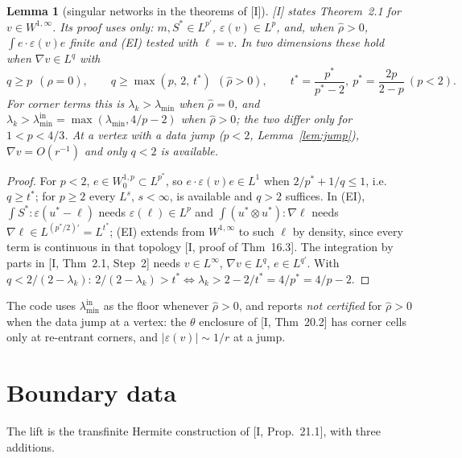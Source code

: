 \documentclass[11pt]{article}
\newtheorem{lemma}[theorem]{Lemma}
\theoremstyle{definition}
\newcommand{\eps}{\varepsilon}
\begin{document}
\begin{lemma}[singular networks in the theorems of {[I]}]\label{lem:sing}
[I] states Theorem~2.1 for $v\in W^{1,\infty}$. Its proof uses only: $m,S^*\in L^{p'}$, $\eps(v)\in L^p$, and, when
$\hat\rho>0$, $\int e\cdot\eps(v)e$ finite and (EI) tested with $\ell=v$. In two dimensions these hold when
$\nabla v\in L^q$ with
\[
q\ge p\ \ (\hat\rho=0),\qquad q\ge\max(p,\,2,\,t^*)\ \ (\hat\rho>0),\qquad t^*=\frac{p^*}{p^*-2},\ p^*=\frac{2p}{2-p}\ (p<2).
\]
For corner terms this is $\lambda_k>\lambda_{\min}$ when $\hat\rho=0$, and $\lambda_k>\lambda_{\min}^{\mathrm{in}}=\max(\lambda_{\min},4/p-2)$
when $\hat\rho>0$; the two differ only for $1<p<4/3$. At a vertex with a data jump ($p<2$, Lemma~\ref{lem:jump}),
$\nabla v=O(r^{-1})$ and only $q<2$ is available.
\end{lemma}
\begin{proof}
For $p<2$, $e\in W^{1,p}_0\subset L^{p^*}$, so $e\cdot\eps(v)e\in L^1$ when $2/p^*+1/q\le1$, i.e.\ $q\ge t^*$; for $p\ge2$
every $L^s$, $s<\infty$, is available and $q>2$ suffices. In (EI), $\int S^*:\eps(u^*-\ell)$ needs $\eps(\ell)\in L^p$ and
$\int(u^*\otimes u^*):\nabla\ell$ needs $\nabla\ell\in L^{(p^*/2)'}=L^{t^*}$; (EI) extends from $W^{1,\infty}$ to such $\ell$ by
density, since every term is continuous in that topology [I, proof of Thm~16.3]. The integration by parts in
[I, Thm~2.1, Step~2] needs $v\in L^\infty$, $\nabla v\in L^q$, $e\in L^{q'}$. With $q<2/(2-\lambda_k)$:
$2/(2-\lambda_k)>t^*\iff\lambda_k>2-2/t^*=4/p^*=4/p-2$.
\end{proof}

The code uses $\lambda_{\min}^{\mathrm{in}}$ as the floor whenever $\hat\rho>0$, and reports \emph{not certified} for
$\hat\rho>0$ when the data jump at a vertex: the $\theta$ enclosure of [I, Thm~20.2] has corner cells only at
re-entrant corners, and $|\eps(v)|\sim1/r$ at a jump.

\section{Boundary data}\label{sec:lift}

The lift is the transfinite Hermite construction of [I, Prop.~21.1], with three additions.
\end{document}
